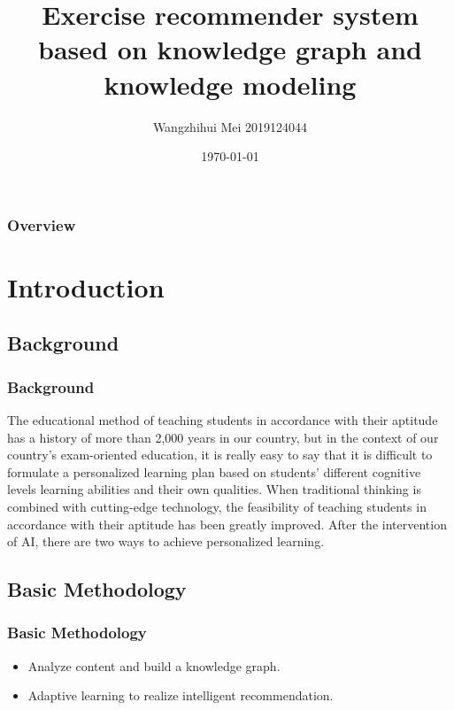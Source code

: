 \documentclass{beamer}
\title[Short title]{Exercise recommender system based on knowledge graph and knowledge modeling} %
\author{ Wangzhihui Mei 2019124044} %
\institute[JI] %
{
CCNU-UOW JI \\ %
\medskip
\textit{maywzh@gmail.com} %
}
\date{\today} %
\begin{document}
\begin{frame}
\titlepage %
\end{frame}

\begin{frame}
\frametitle{Overview} %
\tableofcontents %
\end{frame}


\section{Introduction}
\subsection{Background}
\begin{frame}
  \frametitle{Background}
  The educational method of teaching students in accordance with their aptitude has a history of more than 2,000 years in our country, but in the context of our country’s exam-oriented education, it is really easy to say that it is difficult to formulate a personalized learning plan based on students' different cognitive levels learning abilities and their own qualities. When traditional thinking is combined with cutting-edge technology, the feasibility of teaching students in accordance with their aptitude has been greatly improved. After the intervention of AI, there are two ways to achieve personalized learning.

\end{frame}

\subsection{Basic Methodology}
\begin{frame}
  \frametitle{Basic Methodology}
  \begin{itemize}
    \item Analyze content and build a knowledge graph.
    \item Adaptive learning to realize intelligent recommendation.
  \end{itemize}
\end{frame}
\end{document}
